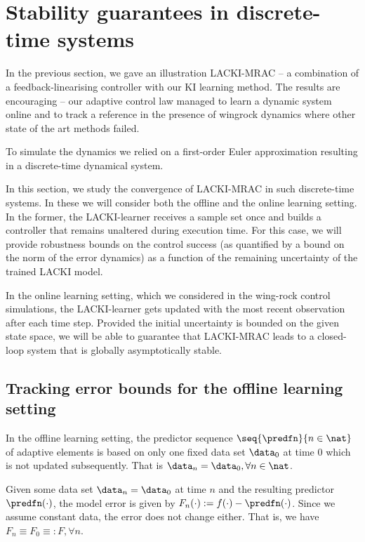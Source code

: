\section{Stability guarantees in discrete-time systems}
\label{sec:KIMRACstabbounds}

In the previous section, we gave an illustration LACKI-MRAC -- a combination of a feedback-linearising controller with our KI learning method. The results are encouraging -- our adaptive control law managed to learn a dynamic system online and to track a reference in the presence of wingrock dynamics where other state of the art methods failed. 

To simulate the dynamics we relied on a first-order Euler approximation resulting in a discrete-time dynamical system.

In this section, we study the convergence of LACKI-MRAC in such discrete-time systems.
In these we will consider both the offline and the online learning setting. In the former, the LACKI-learner receives a sample set once and builds a controller that remains unaltered during execution time.
For this case, we will provide robustness bounds on the control success (as quantified by a bound on the norm of the error dynamics) as a function of the remaining uncertainty of the trained LACKI model. 

In the online learning setting, which we considered in the wing-rock control simulations, the LACKI-learner gets updated with the most recent observation after each time step. Provided the initial uncertainty is bounded on the given state space, we will be able to guarantee that LACKI-MRAC leads to a closed-loop system that is globally asymptotically stable.

\subsection{Tracking error bounds for the offline learning setting} 
In the offline learning setting, the predictor sequence $\seq{\predfn}{n \in \nat}$ of adaptive elements is based on only one fixed data set $\data_0$ at time $0$ which is not updated subsequently.
That is $\data_n = \data_0, \forall n \in \nat$.

Given some data set $\data_n =\data_0$ at time $n$ and the resulting predictor $\predfn(\cdot)$, the model error is given by $F_n(\cdot) := f(\cdot) - \predfn(\cdot)$. Since we assume constant data, the error does not change either. That is, we have $F_n \equiv F_0 \equiv: F, \forall n$.
 
